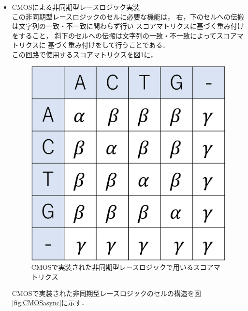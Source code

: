\begin{itemize}
\item CMOSによる非同期型レースロジック実装\\
この非同期型レースロジックのセルに必要な機能は，
右，下のセルへの伝搬は文字列の一致・不一致に関わらず行い
スコアマトリクスに基づく重み付けをすること，
斜下のセルへの伝搬は文字列の一致・不一致によってスコアマトリクスに
基づく重み付けをして行うことである．\\
この回路で使用するスコアマトリクスを図\ref{fig:scoreasync}に，
\begin{figure}[t!]
\begin{center}
\includegraphics[keepaspectratio,scale=0.4]{fig/2/CMOSasyncscore.eps}
\caption{CMOSで実装された非同期型レースロジックで用いるスコアマトリクス}
\label{fig:scoreasync}
\end{center}
\end{figure}
CMOSで実装された非同期型レースロジックのセルの構造を図\ref{fig:CMOSasync}に示す．\\
\begin{figure}[t!]
\begin{center}

\end{center}
\end{figure}
\end{itemize}
